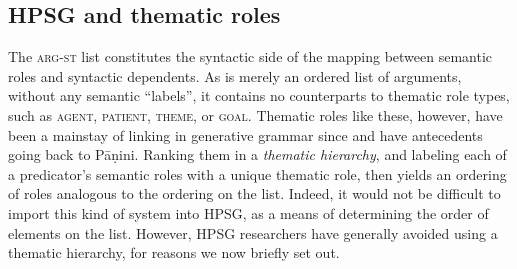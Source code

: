 \documentclass[output=paper
	        ,collection
	        ,collectionchapter
 	        ,biblatex
                ,babelshorthands
                ,newtxmath
                ,draftmode
                ,colorlinks, citecolor=brown
]{langscibook}
\begin{document}

\subsection{HPSG and thematic roles}
\label{thetaroles}


The \textsc{arg-st} list constitutes the syntactic side of the mapping between semantic roles and syntactic dependents.  As \argst is merely an ordered list of arguments, without any semantic ``labels'', it contains no counterparts to thematic role types, such as \textsc{agent}, \textsc{patient}, \textsc{theme}, or \textsc{goal}.  Thematic roles like these, however, have been a mainstay of linking in generative grammar since \citet{Fillmore1968} and have antecedents going back to P\={a}\d{n}ini.
Ranking them in a  \emph{thematic hierarchy}, and labeling each of a predicator's semantic roles with a unique thematic role, then yields an ordering of roles analogous to the ordering on the \argst list.  Indeed, it would not be difficult to import this kind of system into HPSG, as a means of determining the order of elements on the \argst list.  However, HPSG researchers have generally avoided using a thematic hierarchy, for reasons we now briefly set out.
\end{document}

